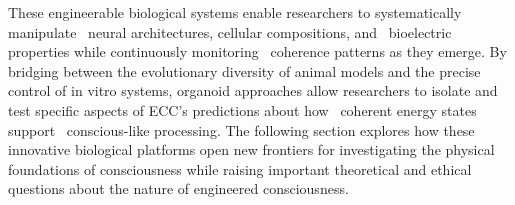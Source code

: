 These engineerable biological systems enable researchers to systematically manipulate~ neural architectures, cellular compositions, and~ bioelectric properties while continuously monitoring~ coherence patterns as they emerge. By bridging between the evolutionary diversity of animal models and the precise control of in vitro systems, organoid approaches allow researchers to isolate and test specific aspects of ECC's predictions about how~ coherent energy states support~ conscious-like processing. The following section explores how these innovative biological platforms open new frontiers for investigating the physical foundations of consciousness while raising important theoretical and ethical questions about the nature of engineered consciousness.

